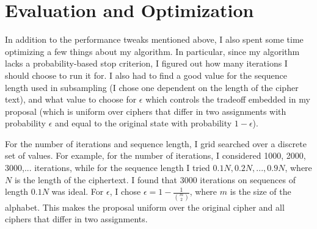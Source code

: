 \documentclass[secnumaric,notitlepage,amsmath,amssymb,nofootinbib,floatfix,12pt]{revtex4-1}
\begin{document}
\section*{Evaluation and Optimization}
In addition to the performance tweaks mentioned above, I also spent some time optimizing a few things about my algorithm. In particular, since my algorithm lacks a probability-based stop criterion, I figured out how many iterations I should choose to run it for. I also had to find a good value for the sequence length used in subsampling (I chose one dependent on the length of the cipher text), and what value to choose for $\epsilon$ which controls the tradeoff embedded in my proposal (which is uniform over ciphers that differ in two assignments with probability $\epsilon$ and equal to the original state with probability $1-\epsilon$).\par
For the number of iterations and sequence length, I grid searched over a discrete set of values. For example, for the number of iterations, I considered 1000, 2000, 3000,... iterations, while for the sequence length I tried $0.1N, 0.2N,...,0.9N$, where $N$ is the length of the ciphertext. I found that 3000 iterations on sequences of length $0.1N$ was ideal. For $\epsilon$, I chose $\epsilon = 1 - \frac{1}{\binom{m}{2}}$, where $m$ is the size of the alphabet. This makes the proposal uniform over the original cipher and all ciphers that differ in two assignments.
\end{document}
